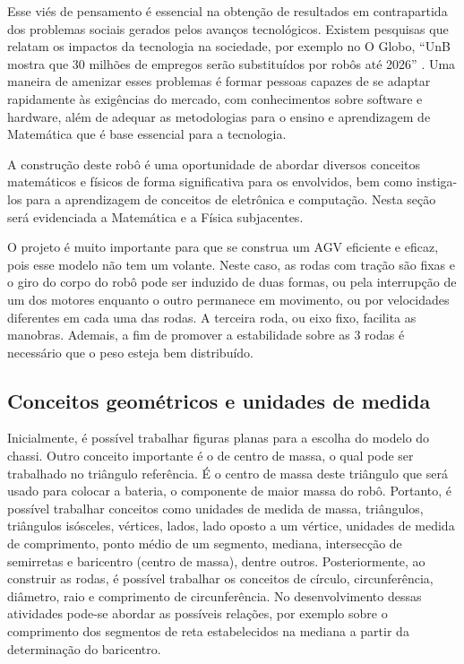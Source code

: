 \documentclass{textolivre}
\begin{document}
Esse viés de pensamento é essencial na obtenção de resultados em contrapartida
dos problemas sociais gerados pelos avanços tecnológicos. Existem pesquisas que
relatam os impactos da tecnologia na sociedade, por exemplo no O Globo, “UnB
mostra que 30 milhões de empregos serão substituídos por robôs até 2026”
\cite{carvalho2019}. Uma maneira de amenizar esses problemas é formar pessoas
capazes de se adaptar rapidamente às exigências do mercado, com conhecimentos
sobre software e hardware, além de adequar as metodologias para o ensino e
aprendizagem de Matemática que é base essencial para a tecnologia.

A construção deste robô é uma oportunidade de abordar diversos conceitos
matemáticos e físicos de forma significativa para os envolvidos, bem como
instiga-los para a aprendizagem de conceitos de eletrônica e computação. Nesta
seção será evidenciada a Matemática e a Física subjacentes.

O projeto é muito importante para que se construa um AGV eficiente e eficaz,
pois esse modelo não tem um volante. Neste caso, as rodas com tração são fixas
e o giro do corpo do robô pode ser induzido de duas formas, ou pela interrupção
de um dos motores enquanto o outro permanece em movimento, ou por velocidades
diferentes em cada uma das rodas. A terceira roda, ou eixo fixo, facilita as
manobras. Ademais, a fim de promover a estabilidade sobre as 3 rodas é
necessário que o peso esteja bem distribuído.


\subsection{Conceitos geométricos e unidades de medida}\label{sec-conceitos}
Inicialmente, é possível trabalhar figuras planas para a escolha do modelo do
chassi. Outro conceito importante é o de centro de massa, o qual pode ser
trabalhado no triângulo referência. É o centro de massa deste triângulo que
será usado para colocar a bateria, o componente de maior massa do robô.
Portanto, é possível trabalhar conceitos como unidades de medida de massa,
triângulos, triângulos isósceles, vértices, lados, lado oposto a um vértice,
unidades de medida de comprimento, ponto médio de um segmento, mediana,
intersecção de semirretas e baricentro (centro de massa), dentre outros.
Posteriormente, ao construir as rodas, é possível trabalhar os conceitos de
círculo, circunferência, diâmetro, raio e comprimento de circunferência. No
desenvolvimento dessas atividades pode-se abordar as possíveis relações, por
exemplo sobre o comprimento dos segmentos de reta estabelecidos na mediana a
partir da determinação do baricentro.
\end{document}
